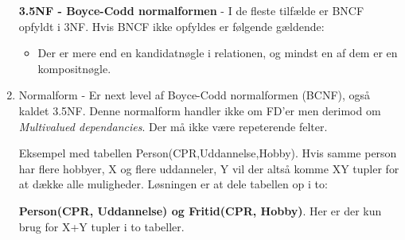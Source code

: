 \begin{enumerate}
	\textbf{3.5NF - Boyce-Codd normalformen} - I de fleste tilfælde er BNCF opfyldt i 3NF. Hvis BNCF ikke opfyldes er følgende gældende:
	
	\begin{itemize}
		\item Der er mere end en kandidatnøgle i relationen, og mindst en af dem er en kompositnøgle.
	\end{itemize}
	
	\item Normalform - Er next level af Boyce-Codd normalformen (BCNF), også kaldet 3.5NF.
	Denne normalform handler ikke om FD'er men derimod om \textit{Multivalued dependancies}.
	Der må ikke være repeterende felter.
	
	Eksempel med tabellen Person(CPR,Uddannelse,Hobby). Hvis samme person har flere hobbyer, X og flere uddanneler, Y vil der altså komme XY tupler for at dække alle muligheder. Løsningen er at dele tabellen op i to: 
	
	\textbf{Person(CPR, Uddannelse) og Fritid(CPR, Hobby)}. Her er der kun brug for X+Y tupler i to tabeller.

\end{enumerate}
